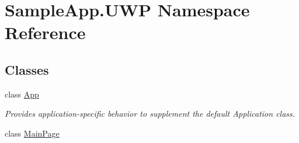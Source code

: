 \hypertarget{namespace_sample_app_1_1_u_w_p}{}\section{Sample\+App.\+U\+WP Namespace Reference}
\label{namespace_sample_app_1_1_u_w_p}
\subsection*{Classes}
\begin{DoxyCompactItemize}
\item 
class \hyperlink{class_sample_app_1_1_u_w_p_1_1_app}{App}
\begin{DoxyCompactList}\small\item\em Provides application-\/specific behavior to supplement the default Application class. \end{DoxyCompactList}\item 
class \hyperlink{class_sample_app_1_1_u_w_p_1_1_main_page}{Main\+Page}
\end{DoxyCompactItemize}

